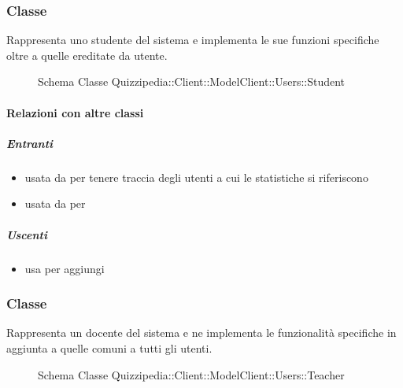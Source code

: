 \subsubsection{Classe }
Rappresenta uno studente del sistema e implementa le sue funzioni specifiche oltre a quelle ereditate da utente.
\begin{figure}[H]
\centering
\noindent{}
\caption[Schema Classe Student]{Schema Classe Quizzipedia::Client::ModelClient::Users::Student}
\end{figure}
\paragraph{Relazioni con altre classi}
\subparagraph{Entranti}
\begin{itemize}
\item usata da  per tenere traccia degli utenti a cui le statistiche si riferiscono
\item usata da  per 
\end{itemize}
\subparagraph{Uscenti}
\begin{itemize}
\item usa  per aggiungi
\end{itemize}
\subsubsection{Classe }
Rappresenta un docente del sistema e ne implementa le funzionalità specifiche in aggiunta a quelle comuni a tutti gli utenti.
\begin{figure}[H]
\centering
\noindent{}
\caption[Schema Classe Teacher]{Schema Classe Quizzipedia::Client::ModelClient::Users::Teacher}
\end{figure}
